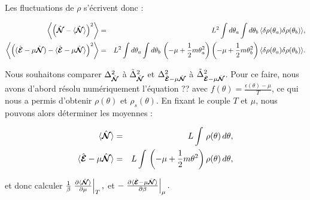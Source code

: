 Les fluctuations de \( \rho \) s'écrivent donc :

\begin{eqnarray*}
    \left \langle  \left ( \hat{\bm{\mathcal{N}}} - \langle \hat{\bm{\mathcal{N}}}  \rangle  \right )^2 \right \rangle  &=& L^2 \int d\theta_a \int d\theta_b \, \langle \delta \rho(\theta_a) \delta \rho(\theta_b) \rangle, \\
    \left \langle  \left (  (\hat{\bm{\mathcal{E}}} - \mu \hat{\bm{\mathcal{N}}}  ) -  \langle\hat{\bm{\mathcal{E}}} - \mu \hat{\bm{\mathcal{N}}}  \rangle  \right )^2  \right \rangle  &=& L^2 \int d\theta_a \int d\theta_b \, \left( - \mu + \frac{1}{2} m \theta_a^2 \right) \left( - \mu + \frac{1}{2} m \theta_b^2 \right) \langle \delta \rho(\theta_a) \delta \rho(\theta_b) \rangle.
\end{eqnarray*}

Nous souhaitons comparer \( \Delta_{\hat{\bm{\mathcal{N}}}}^2 \) à \( \tilde{\Delta}_{\hat{\bm{\mathcal{N}}}}^2 \) et \( \Delta_{\hat{\bm{\mathcal{E}}} - \mu \hat{\bm{\mathcal{N}}}}^2 \) à \( \tilde{\Delta}_{\hat{\bm{\mathcal{E}}} - \mu \hat{\bm{\mathcal{N}}}}^2 \). Pour ce faire, nous avons d'abord résolu numériquement l'équation {??} avec \( f(\theta) = \frac{\epsilon(\theta) - \mu}{T} \), ce qui nous a permis d'obtenir \( \rho(\theta) \) et \( \rho_s(\theta) \). En fixant le couple \( T \) et \( \mu \), nous pouvons alors déterminer les moyennes :

\begin{eqnarray*}
    \langle \hat{\bm{\mathcal{N}}} \rangle &=& L \int \, \rho(\theta) \, d\theta, \\
    \langle \hat{\bm{\mathcal{E}}} - \mu \hat{\bm{\mathcal{N}}} \rangle &=& L \int \, \left( - \mu + \frac{1}{2} m \theta^2  \right) \rho(\theta) \, d\theta,
\end{eqnarray*}

et donc calculer $\frac{1}{\beta} \left. \frac{\partial \langle \hat{\bm{\mathcal{N}}} \rangle}{\partial \mu} \right|_T,$ et $- \left. \frac{\partial \langle \hat{\bm{\mathcal{E}}} - \mu \hat{\bm{\mathcal{N}}} \rangle}{\partial \beta} \right|_\mu.$

